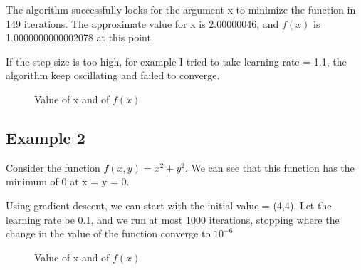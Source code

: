 \documentclass{article}
\begin{document}
The algorithm successfully looks for the argument x to minimize the function in 149 iterations. The approximate value for x is 2.00000046, and $f(x)$ is 1.0000000000002078 at this point.

If the step size is too high, for example I tried to take learning rate = 1.1, the algorithm keep oscillating and failed to converge.

\begin{figure}[H]
    \centering
    \caption{Value of x and of $f(x)$}
    \label{fig:example}
\end{figure}

\subsection{Example 2}
Consider the function $f(x,y) = x^2 + y^2$. We can see that this function has the minimum of 0 at x = y = 0.

Using gradient descent, we can start with the initial value = (4,4). Let the learning rate be 0.1, and we run at most 1000 iterations, stopping where the change in the value of the function converge to $10^{-6}$

\begin{figure}[H]
    \centering
    \caption{Value of x and of $f(x)$}
    \label{fig:example}
\end{figure}
\end{document}
